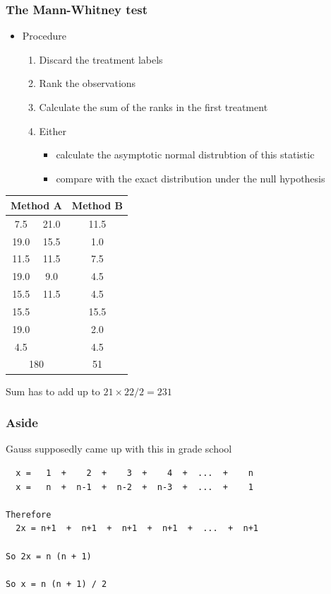 \documentclass[aspectratio=169]{beamer}
\begin{document}
\begin{frame}\frametitle{The Mann-Whitney test}
\begin{itemize}
\item Procedure
  \begin{enumerate}
  \item Discard the treatment labels
  \item Rank the observations 
  \item Calculate the sum of the ranks in the first treatment
  \item Either 
    \begin{itemize}
    \item calculate the asymptotic normal distrubtion of 
      this statistic
    \item compare with the exact distribution under the null hypothesis
    \end{itemize}
\end{enumerate}
\end{itemize}
\end{frame}

\begin{frame}
\begin{center}
\ttfamily
  \begin{tabular}{|cc|c|} \hline
\multicolumn{2}{|c|}{Method A} & Method B \\ \hline
 7.5  & 21.0  & 11.5  \\
19.0  & 15.5  &  1.0  \\
11.5  & 11.5  &  7.5  \\
19.0  &  9.0  &  4.5  \\
15.5  & 11.5  &  4.5  \\
15.5  &       & 15.5  \\
19.0  &       &  2.0  \\
 4.5  &       &  4.5  \\ \hline
\multicolumn{2}{|c|}{180} & 51 \\ \hline
  \end{tabular}
\end{center}
Sum has to add up to $21 \times 22 / 2 = 231$ \normalsize \normalfont
\end{frame}

\begin{frame}[fragile]\frametitle{Aside}
Gauss supposedly came up with this in grade school
\begin{verbatim}
  x =   1  +    2  +    3  +    4  +  ...  +    n
  x =   n  +  n-1  +  n-2  +  n-3  +  ...  +    1

Therefore
  2x = n+1  +  n+1  +  n+1  +  n+1  +  ...  +  n+1

So 2x = n (n + 1) 

So x = n (n + 1) / 2
\end{verbatim}
\end{frame}
\end{document}
